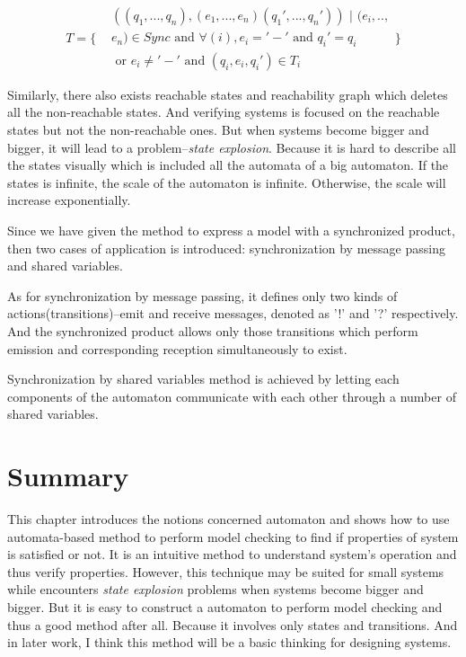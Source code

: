 \documentclass[11pt, conference]{IEEEtran}
\begin{document}
    \begin{equation*}
      T=\Bigg\{
       \begin{split}
            & ((q_1,...,q_n),(e_1,...,e_n)(q_1',...,q_n')) \text{ | } (e_i,.., \\ 
            & e_n) \in Sync \text{ and } \forall(i), e_i='-'\text{ and } q_i'=q_i  \\
             & \text{ or } e_i\neq '-' \text{ and } (q_i,e_i,q_i')\in T_i
      \end{split}
      \Bigg\}
    \end{equation*}

    Similarly, there also exists reachable states and reachability graph which deletes all the non-reachable states. And verifying systems is focused on the reachable states but not the non-reachable ones. But when systems become bigger and bigger, it will lead to a problem--{\itshape state explosion}. Because it is hard to describe all the states visually which is included all the automata of a big automaton. If the states is infinite, the scale of the automaton is infinite. Otherwise, the scale will increase exponentially.

    Since we have given the method to express a model with a synchronized product, then two cases of application is introduced: synchronization by message passing and shared variables.

    As for synchronization by message passing, it defines only two kinds of actions(transitions)--emit and receive messages, denoted as '!' and '?' respectively. And the synchronized product allows only those transitions which perform emission and corresponding reception simultaneously to exist.

    Synchronization by shared variables method is achieved by letting each components of the automaton communicate with each other through a number of shared variables.

    \section{Summary}
    This chapter introduces the notions concerned automaton and shows how to use automata-based method to perform model checking to find if properties of system is satisfied or not. It is an intuitive method to understand system's operation and thus verify properties. However, this technique may be suited for small systems while encounters {\itshape state explosion} problems when systems become bigger and bigger. But it is easy to construct a automaton to perform model checking and thus a good method after all. Because it involves only states and transitions. And in later work, I think this method will be a basic thinking for designing systems.
\end{document}
